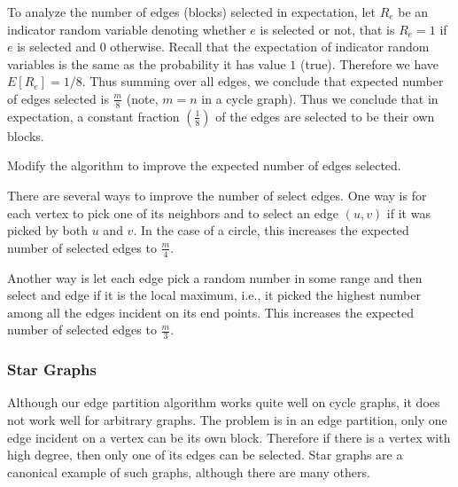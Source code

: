 \begin{gram}
\label{graphcon::edge::analysis::cycle::exp}
To analyze the number of edges (blocks) selected in expectation, let
$R_e$ be an indicator random variable denoting whether $e$ is selected
or not, that is $R_e = 1$ if $e$ is selected and $0$ otherwise.
Recall that the expectation of indicator random variables is the same
as the probability it has value $1$ (true).  Therefore we have $E[R_e]
= 1/8$.
%
Thus summing over all edges, we conclude that expected number of edges
selected is $\frac{m}{8}$ (note, $m=n$ in a cycle graph). 
%
Thus we conclude that in expectation, a constant fraction
$\left(\frac{1}{8}\right)$ of the edges are selected to be their own blocks.
\end{gram}



\begin{flex}
\begin{exercise}
  Modify the algorithm to improve the expected number of edges selected.
\end{exercise}

\begin{gram}
\label{graphcon::edge::analysis::cycle::improve}
There are several ways to improve the number of select edges. 
%
One way is for each vertex to pick one of its neighbors and to select
an edge $(u,v)$ if it was picked by both $u$ and $v$.  In the case of
a circle, this increases the expected number of selected edges to
$\frac{m}{4}$.
%

Another way is let each edge pick a random number in some range and
then select and edge if it is the local maximum, i.e., it picked the
highest number among all the edges incident on its end points. This
increases the expected number of selected edges to
$\frac{m}{3}$.
\end{gram}
\end{flex}

\subsubsection{Star Graphs}
\label{sec:graphcon::edge::analysis::star}

\begin{gram}
\label{graphcon::edge::analysis::star::limitation}
Although our edge partition algorithm works quite well on cycle
graphs,
it does not work well for arbitrary graphs.  The problem is in an edge
partition, only one edge incident on a vertex can be its own block.
%
Therefore if there is a vertex with high degree, then only one of its
edges can be selected.
%
Star graphs are a canonical example of such graphs, although there are
many others.
\end{gram}
%

